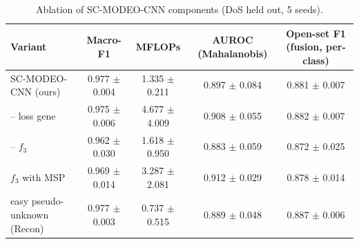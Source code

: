 \begin{table}[t]
\centering
\caption{Ablation of SC-MODEO-CNN components (DoS held out, 5 seeds).}
\label{tab:ablation}
\footnotesize
\begin{tabular}{lcccc}
\toprule
Variant & Macro-F1 & MFLOPs & AUROC (Mahalanobis) & Open-set F1 (fusion, per-class) \\
\midrule
SC-MODEO-CNN (ours) & 0.977 $\pm$ 0.004 & 1.335 $\pm$ 0.211 & 0.897 $\pm$ 0.084 & 0.881 $\pm$ 0.007 \\
– loss gene & 0.975 $\pm$ 0.006 & 4.677 $\pm$ 4.009 & 0.908 $\pm$ 0.055 & 0.882 $\pm$ 0.007 \\
– $f_3$ & 0.962 $\pm$ 0.030 & 1.618 $\pm$ 0.950 & 0.883 $\pm$ 0.059 & 0.872 $\pm$ 0.025 \\
$f_3$ with MSP & 0.969 $\pm$ 0.014 & 3.287 $\pm$ 2.081 & 0.912 $\pm$ 0.029 & 0.878 $\pm$ 0.014 \\
easy pseudo-unknown (Recon) & 0.977 $\pm$ 0.003 & 0.737 $\pm$ 0.515 & 0.889 $\pm$ 0.048 & 0.887 $\pm$ 0.006 \\
\bottomrule
\end{tabular}
\end{table}
